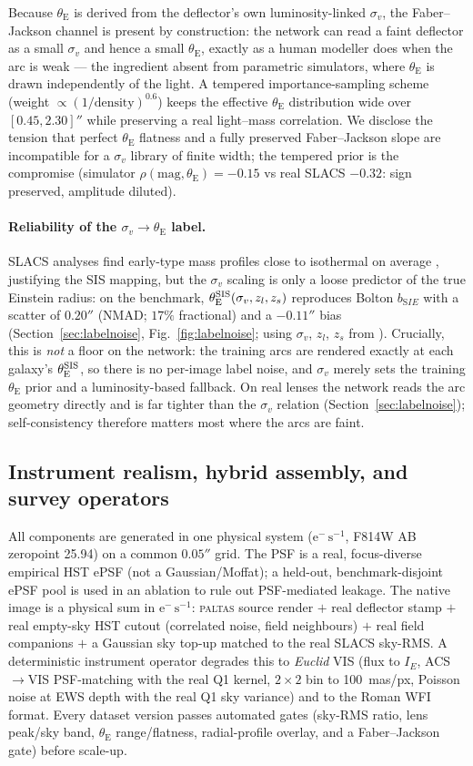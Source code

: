 \documentclass[fleqn,usenatbib]{mnras}
\newcommand{\thetaE}{\theta_{\mathrm{E}}}
\newcommand{\sigmav}{\sigma_{v}}
\newcommand{\bsie}{b_{\mathrm SIE}}
\newcommand{\eps}{\ensuremath{\mathrm{e^{-}\,s^{-1}}}}
\begin{document}
Because $\thetaE$ is derived from the deflector's own luminosity-linked
$\sigmav$, the Faber--Jackson channel is present by construction: the network
can read a faint deflector as a small $\sigmav$ and hence a small $\thetaE$,
exactly as a human modeller does when the arc is weak --- the ingredient absent
from parametric simulators, where $\thetaE$ is drawn independently of the light.
A tempered importance-sampling scheme (weight $\propto(1/\text{density})^{0.6}$)
keeps the effective $\thetaE$ distribution wide over $[0.45,2.30]''$ while
preserving a real light--mass correlation. We disclose the tension that perfect
$\thetaE$ flatness and a fully preserved Faber--Jackson slope are incompatible
for a $\sigmav$ library of finite width; the tempered prior is the compromise
(simulator $\rho(\text{mag},\thetaE)=-0.15$ vs real SLACS $-0.32$: sign
preserved, amplitude diluted).

\paragraph*{Reliability of the $\sigmav\!\rightarrow\!\thetaE$ label.}
SLACS analyses find early-type mass profiles close to isothermal on average
\citep{Koopmans2006,Auger2010}, justifying the SIS mapping, but the $\sigmav$
scaling is only a loose predictor of the true Einstein radius: on the benchmark,
$\thetaE^{\rm SIS}(\sigmav,z_l,z_s)$ reproduces Bolton $\bsie$ with a scatter of
$0.20''$ (NMAD; $17\%$ fractional) and a $-0.11''$ bias
(Section~\ref{sec:labelnoise}, Fig.~\ref{fig:labelnoise}; using $\sigmav$, $z_l$,
$z_s$ from \citealt{Bolton2008}). Crucially, this is \emph{not} a floor on the
network: the training arcs are rendered exactly at each galaxy's
$\thetaE^{\rm SIS}$, so there is no per-image label noise, and $\sigmav$ merely
sets the training $\thetaE$ prior and a luminosity-based fallback. On real lenses
the network reads the arc geometry directly and is far tighter than the
$\sigmav$ relation (Section~\ref{sec:labelnoise}); self-consistency therefore
matters most where the arcs are faint.

\subsection{Instrument realism, hybrid assembly, and survey operators}
All components are generated in one physical system (\eps, F814W AB zeropoint
25.94) on a common $0.05''$ grid. The PSF is a real, focus-diverse empirical
HST ePSF (not a Gaussian/Moffat); a held-out, benchmark-disjoint ePSF pool is
used in an ablation to rule out PSF-mediated leakage. The native image is a
physical sum in \eps: \textsc{paltas} source render $+$ real deflector stamp
$+$ real empty-sky HST cutout (correlated noise, field neighbours) $+$ real
field companions $+$ a Gaussian sky top-up matched to the real SLACS sky-RMS.
A deterministic instrument operator degrades this to \textit{Euclid} VIS (flux
to $I_E$, ACS$\rightarrow$VIS PSF-matching with the real Q1 kernel, $2\times2$
bin to 100~mas/px, Poisson noise at EWS depth with the real Q1 sky variance) and
to the Roman WFI format. Every dataset version passes automated gates
(sky-RMS ratio, lens peak/sky band, $\thetaE$ range/flatness, radial-profile
overlay, and a Faber--Jackson gate) before scale-up.
\end{document}
